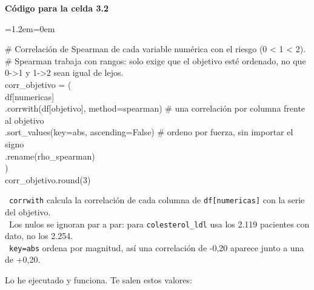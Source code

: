 \documentclass[11pt,a4paper]{article}
\newenvironment{codigo}
  {\par\smallskip\begin{list}{}{\leftmargin=1.2em\rightmargin=0em}\item\relax\ttfamily\scriptsize\raggedright}
  {\end{list}\smallskip}
\begin{document}
{\smallskip\noindent\textbf{Código para la celda 3.2}\par
\begin{codigo}
\# Correlación de Spearman de cada variable numérica con el riesgo (0 \textless{} 1 \textless{} 2). \\{}
\# Spearman trabaja con rangos: solo exige que el objetivo esté ordenado, no que 0-\textgreater{}1 y 1-\textgreater{}2 sean \textquotedbl{}igual de lejos\textquotedbl{}. \\{}
corr\_\allowbreak{}objetivo = ( \\{}
\hspace*{2.08em}df[numericas] \\{}
\hspace*{2.08em}.corrwith(df[objetivo], method=\textquotedbl{}spearman\textquotedbl{})   \# una correlación por columna frente al objetivo \\{}
\hspace*{2.08em}.sort\_\allowbreak{}values(key=abs, ascending=False)       \# ordeno por fuerza, sin importar el signo \\{}
\hspace*{2.08em}.rename(\textquotedbl{}rho\_\allowbreak{}spearman\textquotedbl{}) \\{}
) \\{}
corr\_\allowbreak{}objetivo.round(3)
\end{codigo}
\hspace*{1.0em}\textbullet~\texttt{corrwith} calcula la correlación de cada columna de \texttt{df[numericas]} con la serie del objetivo. \\{}
\hspace*{1.0em}\textbullet~Los nulos se ignoran par a par: para \texttt{colesterol\_\allowbreak{}ldl} usa los 2.119 pacientes con dato, no los 2.254. \\{}
\hspace*{1.0em}\textbullet~\texttt{key=abs} ordena por magnitud, así una correlación de -0,20 aparece junto a una de +0,20.

Lo he ejecutado y funciona. Te salen estos valores:

}
\end{document}

